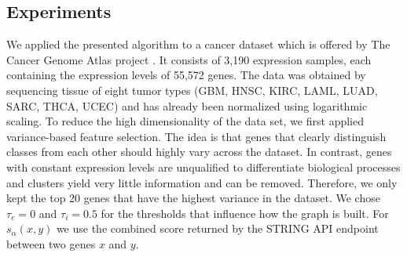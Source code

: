 \documentclass[10pt, conference, compsocconf]{IEEEtran}
\begin{document}
\subsection{Experiments}
We applied the presented algorithm to a cancer dataset which is offered by The Cancer Genome Atlas project \citep{TCGA13}.
It consists of 3,190 expression samples, each containing the expression levels of 55,572 genes.
The data was obtained by sequencing tissue of eight tumor types (GBM, HNSC, KIRC, LAML, LUAD, SARC, THCA, UCEC) and has already been normalized using logarithmic scaling.
To reduce the high dimensionality of the data set, we first applied variance-based feature selection.
The idea is that genes that clearly distinguish classes from each other should highly vary across the dataset.
In contrast, genes with constant expression levels are unqualified to differentiate biological processes and clusters yield very little information and can be removed.
Therefore, we only kept the top 20 genes that have the highest variance in the dataset.
We chose $\tau_e=0$ and $\tau_i=0.5$ for the thresholds that influence how the graph is built.
For $s_\alpha(x, y)$ we use the combined score returned by the STRING API endpoint between two genes $x$ and $y$.
\end{document}
